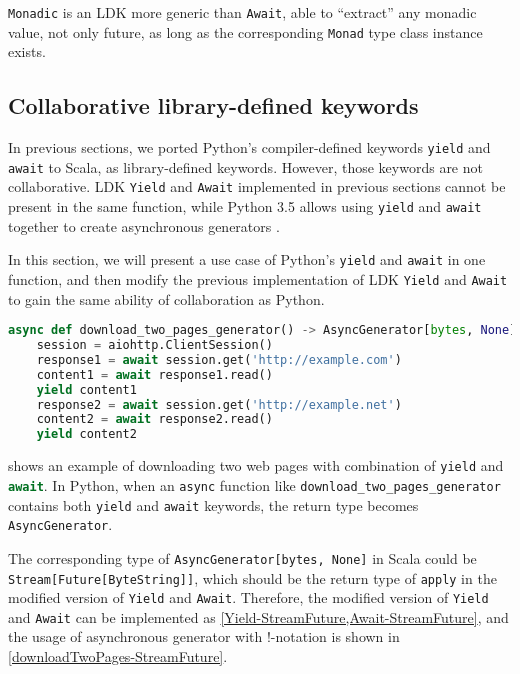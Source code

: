 \lstinline{Monadic} is an LDK more generic than \lstinline{Await}, able to ``extract'' any monadic value, not only future, as long as the corresponding \lstinline{Monad} type class instance exists.

\subsection{Collaborative library-defined keywords}\label{Collaborative library-defined keywords}

In previous sections, we ported Python's compiler-defined keywords \lstinline{yield} and \lstinline{await} to Scala, as library-defined keywords. However, those keywords are not collaborative. LDK \lstinline{Yield} and \lstinline{Await} implemented in previous sections cannot be present in the same function, while Python 3.5 allows using \lstinline{yield} and \lstinline{await} together to create asynchronous generators \cite{pep525}.

In this section, we will present a use case of Python's \lstinline{yield} and \lstinline{await} in one function, and then modify the previous implementation of LDK \lstinline{Yield} and \lstinline{Await} to gain the same ability of collaboration as Python.

\begin{lstlisting}[language=Python,style=Python3,caption={Downloading two web pages as an asynchronous generator in Python},label={download_two_pages_generator-Python}]
async def download_two_pages_generator() -> AsyncGenerator[bytes, None]:
    session = aiohttp.ClientSession()
    response1 = await session.get('http://example.com')
    content1 = await response1.read()
    yield content1
    response2 = await session.get('http://example.net')
    content2 = await response2.read()
    yield content2
\end{lstlisting}

 shows an example of downloading two web pages with combination of \lstinline{yield} and \lstinline[language=Python,style=Python3]{await}. In Python, when an \lstinline{async} function like \lstinline{download_two_pages_generator} contains both \lstinline{yield} and \lstinline{await} keywords, the return type becomes \lstinline{AsyncGenerator}.

The corresponding type of \lstinline{AsyncGenerator[bytes, None]} in Scala could be \lstinline{Stream[Future[ByteString]]}, which should be the return type of \lstinline{apply} in the modified version of \lstinline{Yield} and \lstinline{Await}. Therefore, the modified version of \lstinline{Yield} and \lstinline{Await} can be implemented as \cref{Yield-StreamFuture,Await-StreamFuture}, and the usage of asynchronous generator with !-notation is shown in \cref{downloadTwoPages-StreamFuture}.

